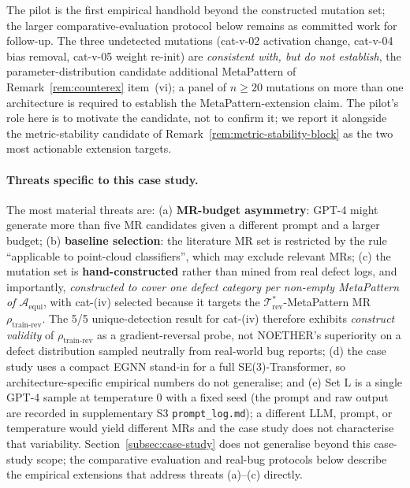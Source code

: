 \documentclass[acmsmall,screen,review]{acmart}
\begin{document}
The pilot is the first empirical handhold beyond the constructed mutation set; the larger comparative-evaluation protocol below remains as committed work for follow-up. The three undetected mutations (cat-v-02 activation change, cat-v-04 bias removal, cat-v-05 weight re-init) are \emph{consistent with, but do not establish}, the parameter-distribution candidate additional MetaPattern of Remark~\ref{rem:counterex} item~(vi); a panel of $n \ge 20$ mutations on more than one architecture is required to establish the MetaPattern-extension claim. The pilot's role here is to motivate the candidate, not to confirm it; we report it alongside the metric-stability candidate of Remark~\ref{rem:metric-stability-block} as the two most actionable extension targets.

\paragraph{Threats specific to this case study.}
The most material threats are: (a) \textbf{MR-budget asymmetry}: GPT-4 might generate more than five MR candidates given a different prompt and a larger budget; (b) \textbf{baseline selection}: the literature MR set is restricted by the rule ``applicable to point-cloud classifiers'', which may exclude relevant MRs; (c) the mutation set is \textbf{hand-constructed} rather than mined from real defect logs, and importantly, \emph{constructed to cover one defect category per non-empty MetaPattern of $\mathcal{A}_{\mathrm{equi}}$}, with cat-(iv) selected because it targets the $\mathcal{T}^{*}_{\mathrm{rev}}$-MetaPattern MR $\rho_{\mathrm{train\text{-}rev}}$. The 5/5 unique-detection result for cat-(iv) therefore exhibits \emph{construct validity} of $\rho_{\mathrm{train\text{-}rev}}$ as a gradient-reversal probe, not NOETHER's superiority on a defect distribution sampled neutrally from real-world bug reports; (d) the case study uses a compact EGNN stand-in for a full SE(3)-Transformer, so architecture-specific empirical numbers do not generalise; and (e) Set L is a single GPT-4 sample at temperature 0 with a fixed seed (the prompt and raw output are recorded in supplementary S3 \texttt{prompt\_log.md}); a different LLM, prompt, or temperature would yield different MRs and the case study does not characterise that variability. Section~\ref{subsec:case-study} does not generalise beyond this case-study scope; the comparative evaluation and real-bug protocols below describe the empirical extensions that address threats (a)--(c) directly.
\end{document}
